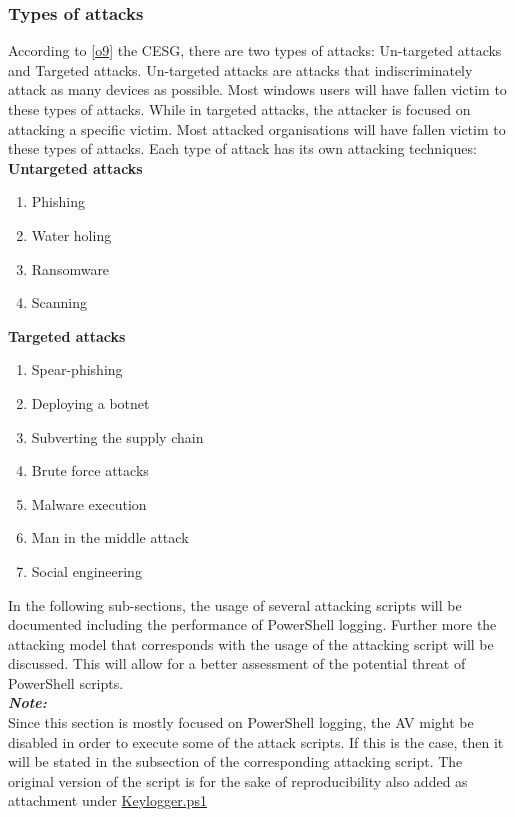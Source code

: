 \documentclass{article}%
\begin{document}
\subsubsection{Types of attacks}
According to [\hyperlink{o9}{o9}] the CESG, there are two types of attacks: Un-targeted attacks and Targeted attacks. Un-targeted attacks are attacks that indiscriminately attack as many devices as possible. Most windows users will have fallen victim to these types of attacks. While in targeted attacks, the attacker is focused on attacking a specific victim. Most attacked organisations will have fallen victim to these types of attacks. Each type of attack has its own attacking techniques:\\
\textbf{Untargeted attacks}
\begin{enumerate}
	\item Phishing
	\item Water holing
	\item Ransomware
	\item Scanning
\end{enumerate}
\textbf{Targeted attacks}
\begin{enumerate}
	\item Spear-phishing
	\item Deploying a botnet
	\item Subverting the supply chain
	\item Brute force attacks
	\item Malware execution
	\item Man in the middle attack
	\item Social engineering
\end{enumerate}
In the following sub-sections, the usage of several attacking scripts will be documented including the performance of PowerShell logging. Further more the attacking model that corresponds with the usage of the attacking script will be discussed. This will allow for a better assessment of the potential threat of PowerShell scripts.\\
\newline
\textbf{\textit{Note:}}\\
Since this section is mostly focused on PowerShell logging, the AV might be disabled in order to execute some of the attack scripts. If this is the case, then it will be stated in the subsection of the corresponding attacking script. The original version of the script is for the sake of reproducibility also added as attachment under \hyperlink{scrip2}{Keylogger.ps1}
\end{document}
